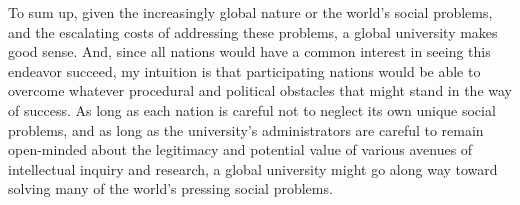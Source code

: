 To sum up, given the increasingly global nature or the world's social problems, and the escalating costs of addressing these problems, a global university makes good sense.
And, since all nations would have a common interest in seeing this endeavor succeed, my intuition is that participating nations would be able to overcome whatever procedural and political obstacles that might stand in the way of success.
As long as each nation is careful not to neglect its own unique social problems, and as long as the university's administrators are careful to remain open-minded about the legitimacy and potential value of various avenues of intellectual inquiry and research, a global university might go along way toward solving many of the world's pressing social problems.
